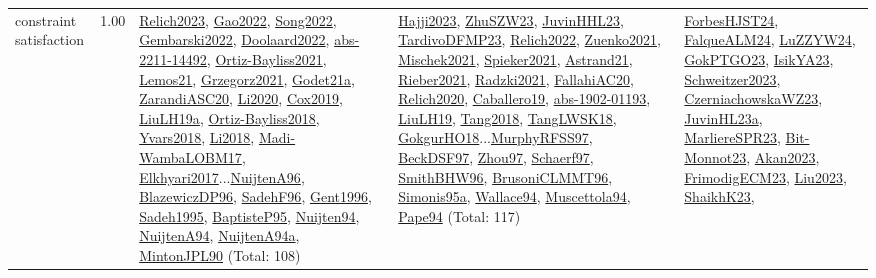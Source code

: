 {\begin{longtable}{p{3cm}r>{\raggedright\arraybackslash}p{6cm}>{\raggedright\arraybackslash}p{6cm}>{\raggedright\arraybackslash}p{8cm}}
\index{constraint satisfaction}\index{CP!constraint satisfaction}constraint satisfaction &  1.00 & \hyperref[detail:Relich2023]{Relich2023}, \hyperref[detail:Gao2022]{Gao2022}, \hyperref[detail:Song2022]{Song2022}, \hyperref[detail:Gembarski2022]{Gembarski2022}, \hyperref[detail:Doolaard2022]{Doolaard2022}, \hyperref[detail:abs-2211-14492]{abs-2211-14492}, \hyperref[detail:Ortiz-Bayliss2021]{Ortiz-Bayliss2021}, \hyperref[detail:Lemos21]{Lemos21}, \hyperref[detail:Grzegorz2021]{Grzegorz2021}, \hyperref[detail:Godet21a]{Godet21a}, \hyperref[detail:ZarandiASC20]{ZarandiASC20}, \hyperref[detail:Li2020]{Li2020}, \hyperref[detail:Cox2019]{Cox2019}, \hyperref[detail:LiuLH19a]{LiuLH19a}, \hyperref[detail:Ortiz-Bayliss2018]{Ortiz-Bayliss2018}, \hyperref[detail:Yvars2018]{Yvars2018}, \hyperref[detail:Li2018]{Li2018}, \hyperref[detail:Madi-WambaLOBM17]{Madi-WambaLOBM17}, \hyperref[detail:Elkhyari2017]{Elkhyari2017}...\hyperref[detail:NuijtenA96]{NuijtenA96}, \hyperref[detail:BlazewiczDP96]{BlazewiczDP96}, \hyperref[detail:SadehF96]{SadehF96}, \hyperref[detail:Gent1996]{Gent1996}, \hyperref[detail:Sadeh1995]{Sadeh1995}, \hyperref[detail:BaptisteP95]{BaptisteP95}, \hyperref[detail:Nuijten94]{Nuijten94}, \hyperref[detail:NuijtenA94]{NuijtenA94}, \hyperref[detail:NuijtenA94a]{NuijtenA94a}, \hyperref[detail:MintonJPL90]{MintonJPL90} (Total: 108) & \hyperref[detail:Hajji2023]{Hajji2023}, \hyperref[detail:ZhuSZW23]{ZhuSZW23}, \hyperref[detail:JuvinHHL23]{JuvinHHL23}, \hyperref[detail:TardivoDFMP23]{TardivoDFMP23}, \hyperref[detail:Relich2022]{Relich2022}, \hyperref[detail:Zuenko2021]{Zuenko2021}, \hyperref[detail:Mischek2021]{Mischek2021}, \hyperref[detail:Spieker2021]{Spieker2021}, \hyperref[detail:Astrand21]{Astrand21}, \hyperref[detail:Rieber2021]{Rieber2021}, \hyperref[detail:Radzki2021]{Radzki2021}, \hyperref[detail:FallahiAC20]{FallahiAC20}, \hyperref[detail:Relich2020]{Relich2020}, \hyperref[detail:Caballero19]{Caballero19}, \hyperref[detail:abs-1902-01193]{abs-1902-01193}, \hyperref[detail:LiuLH19]{LiuLH19}, \hyperref[detail:Tang2018]{Tang2018}, \hyperref[detail:TangLWSK18]{TangLWSK18}, \hyperref[detail:GokgurHO18]{GokgurHO18}...\hyperref[detail:MurphyRFSS97]{MurphyRFSS97}, \hyperref[detail:BeckDSF97]{BeckDSF97}, \hyperref[detail:Zhou97]{Zhou97}, \hyperref[detail:Schaerf97]{Schaerf97}, \hyperref[detail:SmithBHW96]{SmithBHW96}, \hyperref[detail:BrusoniCLMMT96]{BrusoniCLMMT96}, \hyperref[detail:Simonis95a]{Simonis95a}, \hyperref[detail:Wallace94]{Wallace94}, \hyperref[detail:Muscettola94]{Muscettola94}, \hyperref[detail:Pape94]{Pape94} (Total: 117) & \hyperref[detail:ForbesHJST24]{ForbesHJST24}, \hyperref[detail:FalqueALM24]{FalqueALM24}, \hyperref[detail:LuZZYW24]{LuZZYW24}, \hyperref[detail:GokPTGO23]{GokPTGO23}, \hyperref[detail:IsikYA23]{IsikYA23}, \hyperref[detail:Schweitzer2023]{Schweitzer2023}, \hyperref[detail:CzerniachowskaWZ23]{CzerniachowskaWZ23}, \hyperref[detail:JuvinHL23a]{JuvinHL23a}, \hyperref[detail:MarliereSPR23]{MarliereSPR23}, \hyperref[detail:Bit-Monnot23]{Bit-Monnot23}, \hyperref[detail:Akan2023]{Akan2023}, \hyperref[detail:FrimodigECM23]{FrimodigECM23}, \hyperref[detail:Liu2023]{Liu2023}, \hyperref[detail:ShaikhK23]{ShaikhK23}, 
\end{longtable}}
